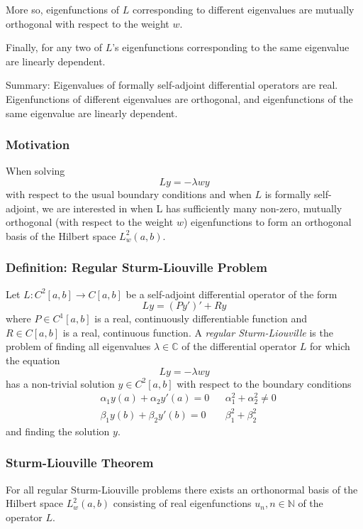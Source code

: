 \documentclass[11pt, a4paper]{article}
\newcommand{\C}{\mathbb{C}} %
\begin{document}
More so, eigenfunctions of $ L $ corresponding to different eigenvalues are mutually orthogonal with respect to the weight $ w $.

Finally, for any two of $ L $'s eigenfunctions corresponding to the same eigenvalue are linearly dependent.

Summary: Eigenvalues of formally self-adjoint differential operators are real. Eigenfunctions of different eigenvalues are orthogonal, and eigenfunctions of the same eigenvalue are linearly dependent.

\subsubsection{Motivation}
When solving
\begin{equation*}
	Ly = -\lambda w y
\end{equation*}
with respect to the usual boundary conditions and when $ L $ is formally self-adjoint, we are interested in when L has sufficiently many non-zero, mutually orthogonal (with respect to the weight $ w $) eigenfunctions to form an orthogonal basis of the Hilbert space $ L_{w}^{2}(a, b) $. 

\subsubsection{Definition: Regular Sturm-Liouville Problem}
Let $ L: C^2[a, b] \to C[a, b] $ be a self-adjoint differential operator of the form
\begin{equation*}
	Ly = (Py')' + Ry
\end{equation*}
where $ P \in C^1[a, b] $ is a real, continuously differentiable function and $ R \in C[a, b] $ is a real, continuous function. A \textit{regular Sturm-Liouville} is the problem of finding all eigenvalues $ \lambda \in \C $ of the differential operator $ L $ for which the equation
\begin{equation*}
	Ly = -\lambda w y
\end{equation*}
has a non-trivial solution $ y \in C^2[a, b] $ with respect to the boundary conditions
\begin{align*}
	&\alpha_1 y(a) + \alpha_2 y'(a) = 0 && \alpha_1^2 + \alpha_2^2 \neq 0\\
	&\beta_1y(b) + \beta_2 y'(b) = 0 &&  \beta_1^2 + \beta_2^2
\end{align*}
and finding the solution $ y $.

\subsubsection{Sturm-Liouville Theorem}
For all regular Sturm-Liouville problems there exists an orthonormal basis of the Hilbert space $ L_{w}^2(a, b) $ consisting of real eigenfunctions $ u_n, n \in \mathbb{N} $ of the operator $ L $.
\end{document}
